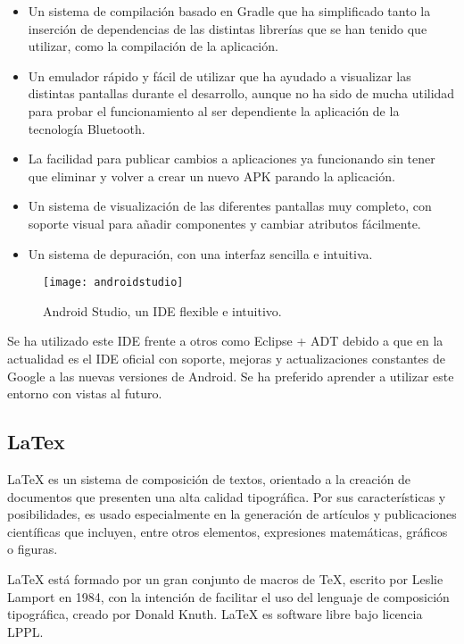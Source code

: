 \begin{itemize}
\item Un sistema de compilación basado en Gradle \cite{URL::Gradle} que ha simplificado tanto la inserción de dependencias de las distintas librerías que se han tenido que utilizar, como la compilación de la aplicación.
\item Un emulador rápido y fácil de utilizar que ha ayudado a visualizar las distintas pantallas durante el desarrollo, aunque no ha sido de mucha utilidad para probar el funcionamiento al ser dependiente la aplicación de la tecnología Bluetooth.
\item La facilidad para publicar cambios a aplicaciones ya funcionando sin tener que eliminar y volver a crear un nuevo APK parando la aplicación.
\item Un sistema de visualización de las diferentes pantallas muy completo, con soporte visual para añadir componentes y cambiar atributos fácilmente.
\item Un sistema de depuración, con una interfaz sencilla e intuitiva.
\end{itemize} 

\begin{figure}[h]
    \centering
    \texttt{[image: androidstudio]}
    \caption{Android Studio, un IDE flexible e intuitivo.}
    \label{fig:androidstudio}
\end{figure}

Se ha utilizado este IDE frente a otros como Eclipse + ADT  \cite{URL::eclipseADT} debido a que en la actualidad es el IDE oficial con soporte, mejoras y actualizaciones constantes de Google a las nuevas versiones de Android. Se ha preferido aprender a utilizar este entorno con vistas al futuro.

\subsection{LaTex}

LaTeX es un sistema de composición de textos, orientado a la creación de documentos que presenten una alta calidad tipográfica. Por sus características y posibilidades, es usado especialmente en la generación de artículos y publicaciones científicas que incluyen, entre otros elementos, expresiones matemáticas, gráficos o figuras.

LaTeX está formado por un gran conjunto de macros de TeX, escrito por Leslie Lamport en 1984, con la intención de facilitar el uso del lenguaje de composición tipográfica, creado por Donald Knuth. LaTeX es software libre bajo licencia LPPL.

